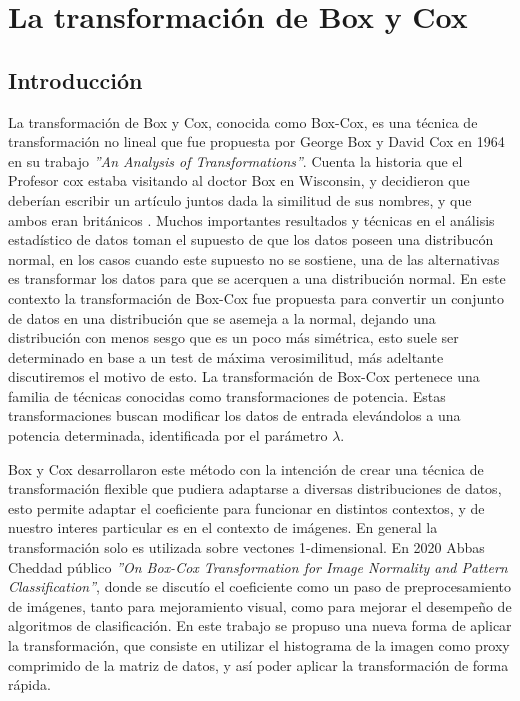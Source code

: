\chapter{La transformaci\'on de Box y Cox}\label{chap4}

    \section{Introducci\'on}
 
    La transformaci\'on de Box y Cox, conocida como Box-Cox, es una t\'ecnica de transformaci\'on no lineal que fue propuesta por George Box y David Cox en 1964 en su trabajo \textit{''An Analysis of Transformations''}\cite{boxcox64}. Cuenta la historia que el Profesor cox estaba visitando al doctor Box en Wisconsin, y decidieron que deberían escribir un artículo juntos dada la similitud de sus nombres, y que ambos eran británicos \cite{lane2003introduction}. 
    Muchos importantes resultados y t\'ecnicas en el an\'alisis estad\'istico de datos toman el supuesto de que los datos poseen una distribuc\'on normal, en los casos cuando este supuesto no se sostiene, una de las alternativas es transformar los datos para que se acerquen a una distribuci\'on normal. En este contexto la transformaci\'on de Box-Cox fue propuesta para convertir un conjunto de datos en una distribuci\'on que se asemeja a la normal, dejando una distribuci\'on con menos sesgo que es un poco m\'as sim\'etrica, esto suele ser determinado en base a un test de m\'axima verosimilitud, m\'as adeltante discutiremos el motivo de esto. La transformaci\'on de Box-Cox pertenece una familia de t\'ecnicas conocidas como transformaciones de potencia. Estas transformaciones buscan modificar los datos de entrada elev\'andolos a una potencia determinada, identificada por el par\'ametro $\lambda$.
    
    Box y Cox desarrollaron este m\'etodo con la intenci\'on de crear una t\'ecnica de transformaci\'on flexible que pudiera adaptarse a diversas distribuciones de datos, esto permite adaptar el coeficiente para funcionar en distintos contextos, y de nuestro interes particular es en el contexto de im\'agenes. En general la transformaci\'on solo es utilizada sobre vectones 1-dimensional. En 2020 Abbas Cheddad p\'ublico \textit{''On Box-Cox Transformation for Image Normality and Pattern Classification''}\cite{boxcoximg}, donde se discut\'io el coeficiente como un paso de preprocesamiento de im\'agenes, tanto para mejoramiento visual, como para mejorar el desempe\~no de algoritmos de clasificaci\'on. En este trabajo se propuso una nueva forma de aplicar la transformaci\'on, que consiste en utilizar el histograma de la imagen como proxy comprimido de la matriz de datos, y as\'i poder aplicar la transformaci\'on de forma r\'apida.
    
